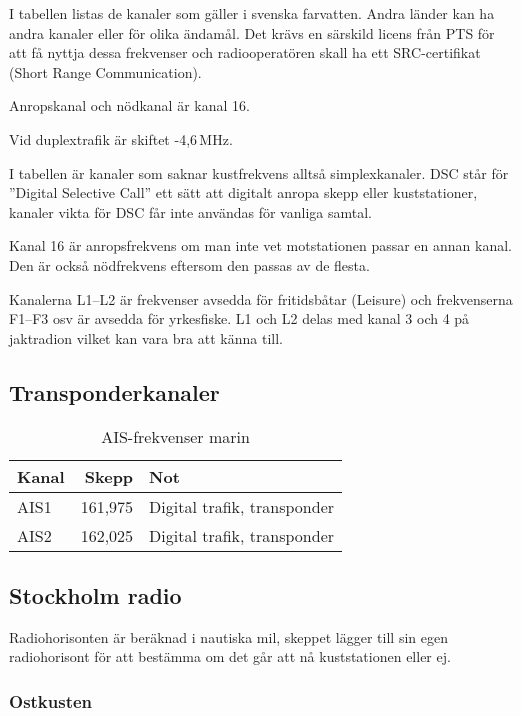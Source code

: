 I tabellen listas de kanaler som gäller i svenska farvatten. Andra
länder kan ha andra kanaler eller för olika ändamål. Det krävs en
särskild licens från PTS för att få nyttja dessa frekvenser och
radiooperatören skall ha ett SRC-certifikat (Short Range
Communication).

Anropskanal och nödkanal är kanal 16.

Vid duplextrafik är skiftet -4,6\,MHz.

I tabellen är kanaler som saknar kustfrekvens alltså
simplexkanaler. DSC står för ''Digital Selective Call'' ett sätt att
digitalt anropa skepp eller kuststationer, kanaler vikta för DSC får
inte användas för vanliga samtal.

Kanal 16 är anropsfrekvens om man inte vet motstationen passar en
annan kanal. Den är också nödfrekvens eftersom den passas av de
flesta.

Kanalerna L1--L2 är frekvenser avsedda för fritidsbåtar (Leisure) och
frekvenserna F1--F3 osv är avsedda för yrkesfiske. L1 och L2 delas med
kanal 3 och 4 på jaktradion vilket kan vara bra att känna till.

\subsection{Transponderkanaler}

\begin{table}[h]
\centering
\begin{tabular}{lrl}
	\textbf{Kanal} & \textbf{Skepp} & \textbf{Not}                \\ \hline
	AIS1           &        161,975 & Digital trafik, transponder \\
	AIS2           &        162,025 & Digital trafik, transponder
\end{tabular}
\caption{AIS-frekvenser marin}
\end{table}

\subsection{Stockholm radio}

Radiohorisonten är beräknad i nautiska mil, skeppet lägger till sin egen
radiohorisont för att bestämma om det går att nå kuststationen eller ej.

\subsubsection{Ostkusten}

